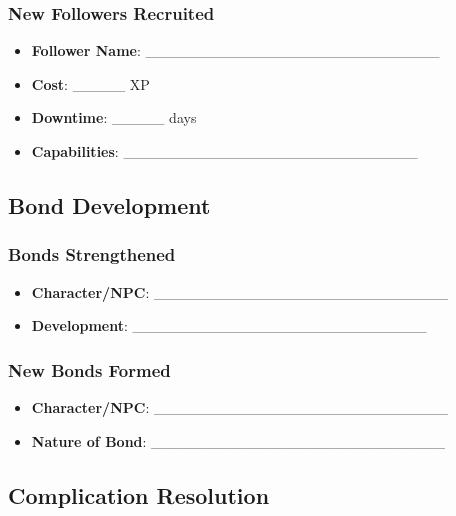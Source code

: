 \subsubsection{New Followers Recruited}
\begin{itemize}
    \item \textbf{Follower Name}: \_\_\_\_\_\_\_\_\_\_\_\_\_\_\_\_\_\_\_\_\_\_\_\_\_\_\_\_
    \item \textbf{Cost}: \_\_\_\_\_ XP
    \item \textbf{Downtime}: \_\_\_\_\_ days
    \item \textbf{Capabilities}: \_\_\_\_\_\_\_\_\_\_\_\_\_\_\_\_\_\_\_\_\_\_\_\_\_\_\_\_
\end{itemize}

\subsection{Bond Development}

\subsubsection{Bonds Strengthened}
\begin{itemize}
    \item \textbf{Character/NPC}: \_\_\_\_\_\_\_\_\_\_\_\_\_\_\_\_\_\_\_\_\_\_\_\_\_\_\_\_
    \item \textbf{Development}: \_\_\_\_\_\_\_\_\_\_\_\_\_\_\_\_\_\_\_\_\_\_\_\_\_\_\_\_
\end{itemize}

\subsubsection{New Bonds Formed}
\begin{itemize}
    \item \textbf{Character/NPC}: \_\_\_\_\_\_\_\_\_\_\_\_\_\_\_\_\_\_\_\_\_\_\_\_\_\_\_\_
    \item \textbf{Nature of Bond}: \_\_\_\_\_\_\_\_\_\_\_\_\_\_\_\_\_\_\_\_\_\_\_\_\_\_\_\_
\end{itemize}

\subsection{Complication Resolution}

